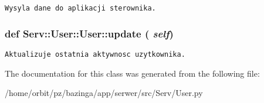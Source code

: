\footnotesize\begin{verbatim}Wysyla dane do aplikacji sterownika.\end{verbatim}
\normalsize
 \hypertarget{class_serv_1_1_user_1_1_user_90697aec786a688ec3308b3ebdcc83a3}{
\subsubsection[{update}]{\setlength{\rightskip}{0pt plus 5cm}def Serv::User::User::update ( {\em self})}}
\label{class_serv_1_1_user_1_1_user_90697aec786a688ec3308b3ebdcc83a3}




\footnotesize\begin{verbatim}Aktualizuje ostatnia aktywnosc uzytkownika.\end{verbatim}
\normalsize
 

The documentation for this class was generated from the following file:\begin{CompactItemize}
\item 
/home/orbit/pz/bazinga/app/serwer/src/Serv/User.py\end{CompactItemize}
